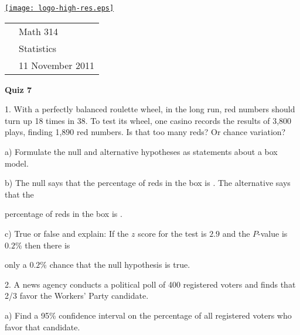 \documentclass[10pt]{article}
\newcommand{\HH}{\hspace{20pt} \hphantom{a)} }
\begin{document}
\pagestyle{empty}
\lstset{language=R, showspaces=false, showstringspaces=false}

\href{http://www.shepherd.edu}{\texttt{[image: logo-high-res.eps]}}
\vspace{-1.79cm}

{\small
\begin{tabular}{cl}
& Math 314\\
& Statistics\\
\hspace{5.28in} & 11 November 2011
\end{tabular}
}
\setlength{\baselineskip}{1.05\baselineskip}

\begin{center}
\textbf{\large  Quiz 7}
\end{center}

1. With a perfectly balanced roulette wheel, in the long run, 
red numbers should turn up 18 times in 38.
To test its wheel, one casino records the results of 3,800 plays, finding 1,890 red
numbers.  Is that too many reds?  Or chance variation?

\hspace{20pt} a) Formulate the null and alternative hypotheses as 
statements about a box model.
\vspace{1.5in}

\hspace{20pt} b) The null says that the percentage of reds in the box is
\underline{\hspace{30pt}}.  The alternative says that the\vspace{-4pt}

\HH percentage of reds in the box is 
\underline{\hspace{30pt}}.
\bigskip
\bigskip


\hspace{20pt} c) True or false and explain:
If the $z$ score for the test is $2.9$ and the $P$-value is $0.2$\%
then there is\vspace{-4pt}

\HH only a $0.2$\% chance that the null hypothesis is true.
\vspace{.5in}

2. A news agency conducts a political poll of 400 registered voters and finds that
  2/3 favor the Workers' Party candidate.  

\hspace{20pt} a) Find a 95\% confidence interval on 
  the percentage of all registered voters who favor that candidate.\vspace{-4pt}
\end{document}
